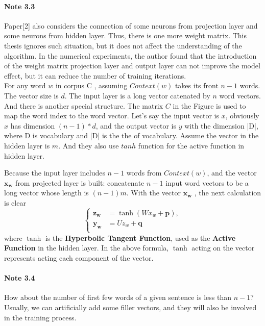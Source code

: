 \paragraph{Note 3.3} Paper[2] also considers the connection of some neurons from projection layer and some neurons from hidden layer. Thus, there is one more weight matrix. This thesis ignores such situation, but it does not affect the understanding of the algorithm. In the numerical experiments, the author found that the introduction of the weight matrix projection layer and output layer can not improve the model effect, but it can reduce the number of training iterations.\\

For any word $w$ in corpus \gls{C} , assuming $Context(w)$ takes its front $n-1$ words. The vector size is $d$. The input layer is a long vector catenated by $n$ word vectors. And there is another special structure. The matrix $C$ in the Figure is used to map the word index to the word vector. Let's say the input vector is $x$, obviously $x$ has dimension $(n-1)*d$, and the output vector is $y$ with the dimension |\gls{D}|, where \gls{D} is vocabulary and |\gls{D}| is the the of vocabulary. Assume the vector in the hidden layer is $m$. And they also use $tanh$ function for the active function in hidden layer.

 Because the input layer includes $n-1$ words from $Context(w)$, and the vector $\mathbf{x_w}$ from projected layer is built: concatenate $n-1$ input word vectors to be a long vector whose length is $(n-1)m$. With the vector $\mathbf{x_w}$ , the next calculation is clear
$$ \left\{
\begin{aligned}
\mathbf{z_w} & =  \tanh(W x_w+\mathbf{p}),\\
\mathbf{y_w} & =  U z_w + \mathbf{q}\\
\end{aligned}
\right.
$$
where $\tanh$ is the \textbf{Hyperbolic Tangent Function}, used as the \textbf{Active Function} in the hidden layer. In the above formula, $\tanh$ acting on the vector represents acting each component of the vector.

\paragraph{Note 3.4} How about the number of first few words of a given sentence is less than $n-1$? Usually, we can artificially add some filler vectors, and they will also be involved in the training process.\\

